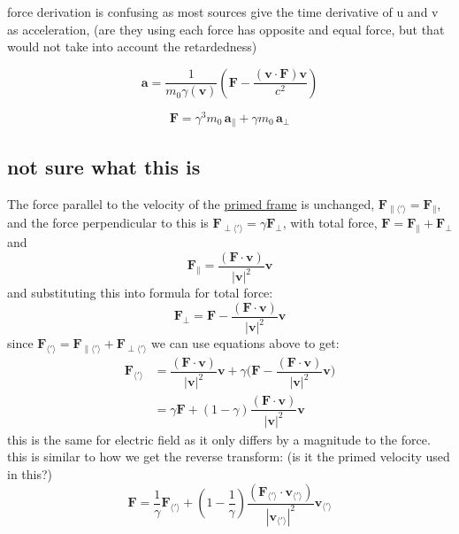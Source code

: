 force derivation is confusing as most sources give the time derivative of u and v as acceleration, (are they using each force has opposite and equal force, but that would not take into account the retardedness)

\begin{equation}%
    \mathbf{a} = \frac{1}{m_0 \gamma(\mathbf{v})} \left( \mathbf{F} - \frac{ ( \mathbf{v} \cdot \mathbf{F} ) \mathbf{v} }{c^2} \right)
\end{equation}%

\begin{equation}%
    \mathbf{F} = \gamma^3 m_0 \, \mathbf{a}_\parallel + \gamma m_0 \, \mathbf{a}_\perp
\end{equation}%

\subsection{not sure what this is}
The force parallel to the velocity of the \hyperlink{def-Primed-Frame}{primed frame} is unchanged, $\mathbf{F}_{\parallel \langle ' \rangle} =\mathbf{F}_{\parallel}$, and the force perpendicular to this is $\mathbf{F}_{\perp \langle ' \rangle} =\gamma \mathbf{F}_{\perp}$, with total force, $\mathbf{F}=\mathbf{F}_{\parallel}+\mathbf{F}_{\perp}$ and
\begin{equation}%
    \mathbf{F}_{\parallel} = \dfrac{(\mathbf{F}\cdot\mathbf{v})}{|\mathbf{v}|^2}\mathbf{v}
\end{equation}%
and substituting this into formula for total force:
\begin{equation}%
    \mathbf{F}_{\perp} = \mathbf{F}-\dfrac{(\mathbf{F}\cdot\mathbf{v})}{|\mathbf{v}|^2}\mathbf{v}
\end{equation}%
since $\mathbf{F}_{\langle ' \rangle} =\mathbf{F}_{\parallel \langle ' \rangle} +\mathbf{F}_{\perp\langle ' \rangle}$ we can use equations above to get:
\begin{equation}%
    \begin{split}
    \mathbf{F}_{\langle ' \rangle}  &= \dfrac{(\mathbf{F}\cdot\mathbf{v})}{|\mathbf{v}|^2}\mathbf{v} + \gamma\bigg(\mathbf{F}-\dfrac{(\mathbf{F}\cdot\mathbf{v})}{|\mathbf{v}|^2}\mathbf{v}\bigg)\\
    &= \gamma\mathbf{F} + (1-\gamma)\dfrac{(\mathbf{F}\cdot\mathbf{v})}{|\mathbf{v}|^2}\mathbf{v}
    \end{split}
\end{equation}%
this is the same for electric field as it only differs by a magnitude to the force.\newline
this is similar to how we get the reverse transform: (is it the primed velocity used in this?)
\begin{equation}%
    \mathbf{F} = \dfrac{1}{\gamma}\mathbf{F}_{\langle ' \rangle}  + (1-\dfrac{1}{\gamma})\dfrac{(\mathbf{F}_{\langle ' \rangle} \cdot\mathbf{v}_{\langle ' \rangle} )}{|\mathbf{v}_{\langle ' \rangle} |^2}\mathbf{v}_{\langle ' \rangle} 
\end{equation}%

